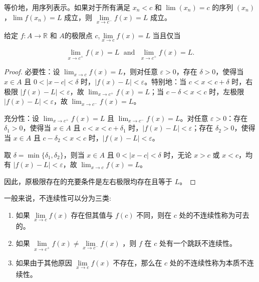 等价地，用序列表示。如果对于所有满足 \({x}_{n} < c\) 和 \(\lim \left( {x}_{n} \right) = c\) 的序列 \(\left( {x}_{n} \right)\)，\(\lim f\left( {x}_{n} \right) = L\) 成立，则 \(\mathop{\lim }\limits_{{x \rightarrow {c}^{-}}} f(x) = L\) 成立。


\begin{Thm}
  \label{thm:4.6.3}
给定 \(f : A\rightarrow  \mathbb{R}\) 和 \(A\)的极限点 \(c\),\(\mathop{\lim }\limits_{{x \rightarrow  c}}f\left( x\right)  = L\)  当且仅当

\[
\mathop{\lim }\limits_{{x \rightarrow  {c}^{ + }}}f\left( x\right)  = L\;\text{ and }\;\mathop{\lim }\limits_{{x \rightarrow  {c}^{ + }}}f\left( x\right)  = L.
\]  
\end{Thm}

\begin{proof}
 必要性：设 \(\lim_{x \to c} f(x) = L\)，则对任意 \(\varepsilon > 0\)，存在 \(\delta > 0\)，使得当 \(x \in A\) 且 \(0 < |x - c| < \delta\) 时，\(|f(x) - L| < \varepsilon\)。特别地：当 \(c < x < c + \delta\) 时，右极限 \(|f(x) - L| < \varepsilon\)，故 \(\lim_{x \to c^+} f(x) = L\)；当 \(c - \delta < x < c\) 时，左极限 \(|f(x) - L| < \varepsilon\)，故 \(\lim_{x \to c^-} f(x) = L\)。

充分性：设 \(\lim_{x \to c^+} f(x) = L\) 且 \(\lim_{x \to c^-} f(x) = L\)。对任意 \(\varepsilon > 0\)：存在 \(\delta_1 > 0\)，使得当 \(x \in A\) 且 \(c < x < c + \delta_1\) 时，\(|f(x) - L| < \varepsilon\)；存在 \(\delta_2 > 0\)，使得当 \(x \in A\) 且 \(c - \delta_2 < x < c\) 时，\(|f(x) - L| < \varepsilon\)。

取 \(\delta = \min\{\delta_1, \delta_2\}\)，则当 \(x \in A\) 且 \(0 < |x - c| < \delta\) 时，无论 \(x > c\) 或 \(x < c\)，均有 \(|f(x) - L| < \varepsilon\)，故 \(\lim_{x \to c} f(x) = L\)。

因此，原极限存在的充要条件是左右极限均存在且等于 \(L\)。
\end{proof}


一般来说，不连续性可以分为三类:

\begin{enumerate}
\item\label{item:4.6.1}  如果 \(\mathop{\lim }\limits_{{x \rightarrow  c}}f\left( x\right)\) 存在但其值与 \(f\left( c\right)\) 不同，则在 \(c\) 处的不连续性称为可去的。
\item \label{item:4.6.2} 如果 \(\mathop{\lim }\limits_{{x \rightarrow  {c}^{ + }}}f\left( x\right)  \neq  \mathop{\lim }\limits_{{x \rightarrow  {c}^{ - }}}f\left( x\right)\) ，则 \(f\) 在 \(c\) 处有一个跳跃不连续性。
\item \label{item:4.6.3} 如果由于其他原因 \(\mathop{\lim }\limits_{{x \rightarrow  c}}f\left( x\right)\) 不存在，那么在 \(c\) 处的不连续性称为本质不连续性。
\end{enumerate}


